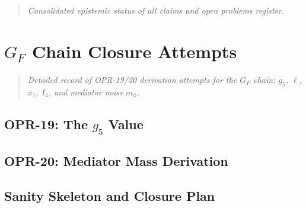 \documentclass[11pt,a4paper]{book}
\theoremstyle{definition}
\theoremstyle{remark}
\begin{document}
\begin{quote}
\textit{Consolidated epistemic status of all claims and open problems register.}
\end{quote}



\chapter{$G_F$ Chain Closure Attempts}
\label{ch:gf_closure}

\begin{quote}
\textit{Detailed record of OPR-19/20 derivation attempts for the $G_F$ chain:
$g_5$, $\ell$, $x_1$, $I_4$, and mediator mass $m_\phi$.}
\end{quote}

\section{OPR-19: The $g_5$ Value}






\section{OPR-20: Mediator Mass Derivation}











\section{Sanity Skeleton and Closure Plan}


\end{document}
